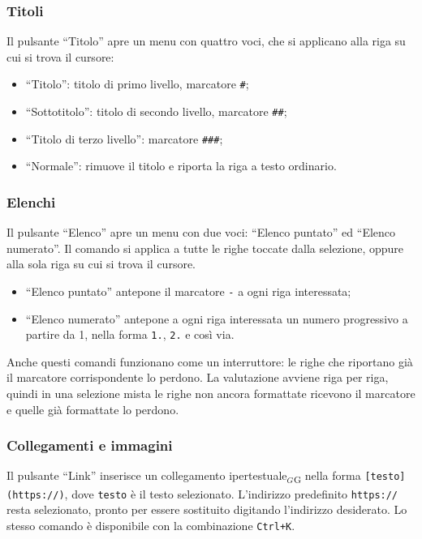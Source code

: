 \documentclass[a4paper, 10pt]{article}
\begin{document}
\subsubsection{Titoli}
\label{sec:titoli}
Il pulsante ``Titolo'' apre un menu con quattro voci, che si applicano alla riga su cui si trova il cursore:

\begin{itemize}
    \item ``Titolo'': titolo di primo livello, marcatore \texttt{\#};

    \item ``Sottotitolo'': titolo di secondo livello, marcatore \texttt{\#\#};

    \item ``Titolo di terzo livello'': marcatore \texttt{\#\#\#};

    \item ``Normale'': rimuove il titolo e riporta la riga a testo ordinario.
\end{itemize}

\subsubsection{Elenchi}
\label{sec:elenchi}
Il pulsante ``Elenco'' apre un menu con due voci: ``Elenco puntato'' ed ``Elenco numerato''. Il comando si applica a tutte le righe toccate dalla selezione, oppure alla sola riga su cui si trova il cursore.

\begin{itemize}
    \item ``Elenco puntato'' antepone il marcatore \texttt{-} a ogni riga interessata;

    \item ``Elenco numerato'' antepone a ogni riga interessata un numero progressivo a partire da 1, nella forma \texttt{1.}, \texttt{2.} e così via.
\end{itemize}

Anche questi comandi funzionano come un interruttore: le righe che riportano già il marcatore corrispondente lo perdono. La valutazione avviene riga per riga, quindi in una selezione mista le righe non ancora formattate ricevono il marcatore e quelle già formattate lo perdono.

\subsubsection{Collegamenti e immagini}
\label{sec:collegamenti-immagini}
Il pulsante ``Link'' inserisce un collegamento ipertestuale$_G$\textsubscript{G} nella forma \texttt{[testo](https://)}, dove \texttt{testo} è il testo selezionato. L'indirizzo predefinito \texttt{https://} resta selezionato, pronto per essere sostituito digitando l'indirizzo desiderato. Lo stesso comando è disponibile con la combinazione \texttt{Ctrl+K}.
\end{document}
